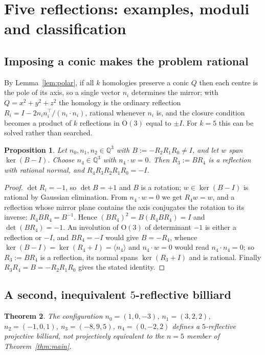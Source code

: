 \documentclass[11pt,a4paper]{article}
\theoremstyle{plain}
\newtheorem{theorem}{Theorem}[section]
\newtheorem{proposition}[theorem]{Proposition}
\theoremstyle{definition}
\theoremstyle{remark}
\begin{document}
\section{Five reflections: examples, moduli and classification}\label{sec:other}

\subsection{Imposing a conic makes the problem rational}

By Lemma~\ref{lem:polar}, if all $k$ homologies preserve a conic $Q$ then each
centre is the pole of its axis, so a single vector $n_i$ determines the mirror;
with $Q=x^2+y^2+z^2$ the homology is the ordinary reflection
$R_i=I-2n_in_i^\top/(n_i\!\cdot\!n_i)$, rational whenever $n_i$ is, and the closure
condition becomes a product of $k$ reflections in $\mathrm{O}(3)$ equal to $\pm I$.
For $k=5$ this can be solved rather than searched.

\begin{proposition}\label{prop:construct}
Let $n_0,n_1,n_2\in\mathbb{Q}^3$ with $B:=-R_2R_1R_0\neq I$, and let $w$ span
$\ker(B-I)$. Choose $n_4\in\mathbb{Q}^3$ with $n_4\cdot w=0$. Then $R_3:=BR_4$ is a
reflection with rational normal, and $R_4R_3R_2R_1R_0=-I$.
\end{proposition}

\begin{proof}
$\det R_i=-1$, so $\det B=+1$ and $B$ is a rotation; $w\in\ker(B-I)$ is rational by
Gaussian elimination. From $n_4\cdot w=0$ we get $R_4w=w$, and a reflection whose
mirror plane contains the axis conjugates the rotation to its inverse:
$R_4BR_4=B^{-1}$. Hence $(BR_4)^2=B(R_4BR_4)=I$ and $\det(BR_4)=-1$. An
involution of $\mathrm{O}(3)$ of determinant $-1$ is either a reflection or $-I$,
and $BR_4=-I$ would give $B=-R_4$, whence
$\ker(B-I)=\ker(R_4+I)=\langle n_4\rangle$ and $n_4\cdot w=0$ would read
$n_4\cdot n_4=0$; so $R_3:=BR_4$
is a reflection, its normal spans $\ker(R_3+I)$ and is rational. Finally
$R_3R_4=B=-R_2R_1R_0$ gives the stated identity.
\end{proof}

\subsection{A second, inequivalent $5$-reflective billiard}

\begin{theorem}\label{thm:second}
The configuration $n_0=(1,0,-3)$, $n_1=(3,2,2)$, $n_2=(-1,0,1)$, $n_3=(-8,9,5)$,
$n_4=(0,-2,2)$ defines a $5$-reflective projective billiard, not projectively
equivalent to the $n=5$ member of Theorem~\ref{thm:main}.
\end{theorem}
\end{document}
